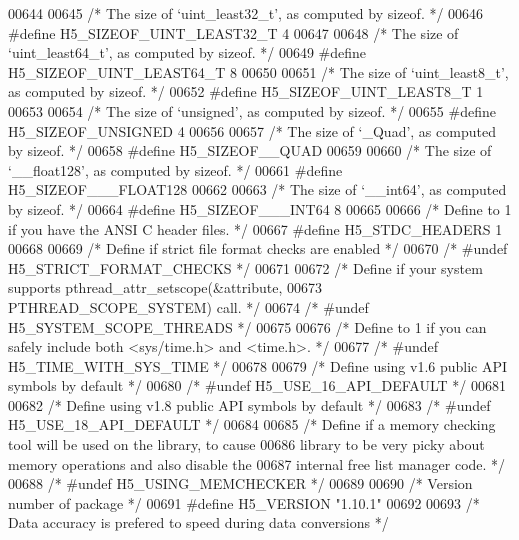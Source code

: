 \begin{DoxyCode}
{00644 
00645 \textcolor{comment}{/* The size of `uint\_least32\_t', as computed by sizeof. */}
00646 \textcolor{preprocessor}{#define H5\_SIZEOF\_UINT\_LEAST32\_T 4}
00647 
00648 \textcolor{comment}{/* The size of `uint\_least64\_t', as computed by sizeof. */}
00649 \textcolor{preprocessor}{#define H5\_SIZEOF\_UINT\_LEAST64\_T 8}
00650 
00651 \textcolor{comment}{/* The size of `uint\_least8\_t', as computed by sizeof. */}
00652 \textcolor{preprocessor}{#define H5\_SIZEOF\_UINT\_LEAST8\_T 1}
00653 
00654 \textcolor{comment}{/* The size of `unsigned', as computed by sizeof. */}
00655 \textcolor{preprocessor}{#define H5\_SIZEOF\_UNSIGNED 4}
00656 
00657 \textcolor{comment}{/* The size of `\_Quad', as computed by sizeof. */}
00658 \textcolor{preprocessor}{#define H5\_SIZEOF\_\_QUAD }
00659 
00660 \textcolor{comment}{/* The size of `\_\_float128', as computed by sizeof. */}
00661 \textcolor{preprocessor}{#define H5\_SIZEOF\_\_\_FLOAT128 }
00662 
00663 \textcolor{comment}{/* The size of `\_\_int64', as computed by sizeof. */}
00664 \textcolor{preprocessor}{#define H5\_SIZEOF\_\_\_INT64 8}
00665 
00666 \textcolor{comment}{/* Define to 1 if you have the ANSI C header files. */}
00667 \textcolor{preprocessor}{#define H5\_STDC\_HEADERS 1}
00668 
00669 \textcolor{comment}{/* Define if strict file format checks are enabled */}
00670 \textcolor{comment}{/* #undef H5\_STRICT\_FORMAT\_CHECKS */}
00671 
00672 \textcolor{comment}{/* Define if your system supports pthread\_attr\_setscope(&attribute,}
00673 \textcolor{comment}{   PTHREAD\_SCOPE\_SYSTEM) call. */}
00674 \textcolor{comment}{/* #undef H5\_SYSTEM\_SCOPE\_THREADS */}
00675 
00676 \textcolor{comment}{/* Define to 1 if you can safely include both <sys/time.h> and <time.h>. */}
00677 \textcolor{comment}{/* #undef H5\_TIME\_WITH\_SYS\_TIME */}
00678 
00679 \textcolor{comment}{/* Define using v1.6 public API symbols by default */}
00680 \textcolor{comment}{/* #undef H5\_USE\_16\_API\_DEFAULT */}
00681 
00682 \textcolor{comment}{/* Define using v1.8 public API symbols by default */}
00683 \textcolor{comment}{/* #undef H5\_USE\_18\_API\_DEFAULT */}
00684 
00685 \textcolor{comment}{/* Define if a memory checking tool will be used on the library, to cause}
00686 \textcolor{comment}{   library to be very picky about memory operations and also disable the}
00687 \textcolor{comment}{   internal free list manager code. */}
00688 \textcolor{comment}{/* #undef H5\_USING\_MEMCHECKER */}
00689 
00690 \textcolor{comment}{/* Version number of package */}
00691 \textcolor{preprocessor}{#define H5\_VERSION "1.10.1"}
00692 
00693 \textcolor{comment}{/* Data accuracy is prefered to speed during data conversions */}
}
\end{DoxyCode}
